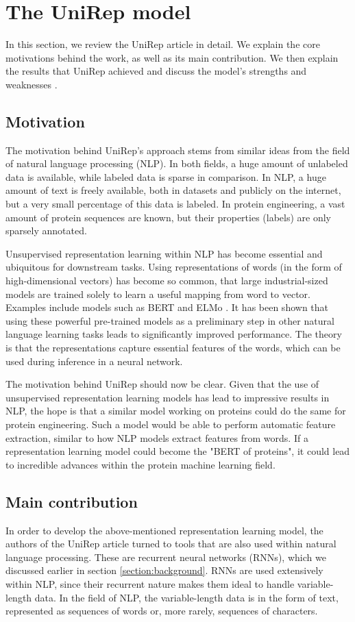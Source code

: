 \documentclass[a4paper,12pt]{article}
\begin{document}
\clearpage
\section{The UniRep model}
In this section, we review the UniRep article in detail. We explain the core motivations behind the work, as well as its main contribution. We then explain the results that UniRep achieved and discuss the model's strengths and weaknesses .

\subsection{Motivation}
The motivation behind UniRep's approach stems from similar ideas from the field of natural language processing (NLP). In both fields, a huge amount of unlabeled data is available, while labeled data is sparse in comparison. In NLP, a huge amount of text is freely available, both in datasets and publicly on the internet, but a very small percentage of this data is labeled. In protein engineering, a vast amount of protein sequences are known, but their properties (labels) are only sparsely annotated.

Unsupervised representation learning within NLP has become essential and ubiquitous for downstream tasks. Using representations of words (in the form of high-dimensional vectors) has become so common, that large industrial-sized models are trained solely to learn a useful mapping from word to vector. Examples include models such as BERT and ELMo . It has been shown that using these powerful pre-trained models as a preliminary step in other natural language learning tasks leads to significantly improved performance. The theory is that the representations capture essential features of the words, which can be used during inference in a neural network.

The motivation behind UniRep should now be clear. Given that the use of unsupervised representation learning models has lead to impressive results in NLP, the hope is that a similar model working on proteins could do the same for protein engineering. Such a model would be able to perform automatic feature extraction, similar to how NLP models extract features from words. If a representation learning model could become the "BERT of proteins", it could lead to incredible advances within the protein machine learning field.

\subsection{Main contribution}
In order to develop the above-mentioned representation learning model, the authors of the UniRep article turned to tools that are also used within natural language processing. These are recurrent neural networks (RNNs), which we discussed earlier in section \ref{section:background}. RNNs are used extensively within NLP, since their recurrent nature makes them ideal to handle variable-length data. In the field of NLP, the variable-length data is in the form of text, represented as sequences of words or, more rarely, sequences of characters.
\end{document}
